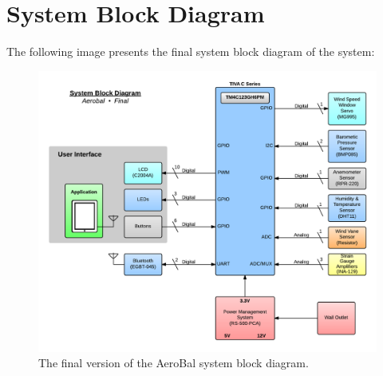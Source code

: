 \section{System Block Diagram}
	
	The following image presents the final system block diagram of the system:
		
		\begin{figure}[H]
			\centering
				\includegraphics[scale=0.30]{img/sbdf}
			\caption{The final version of the AeroBal system block diagram.}
		\end{figure}



\newpage

\leavevmode
